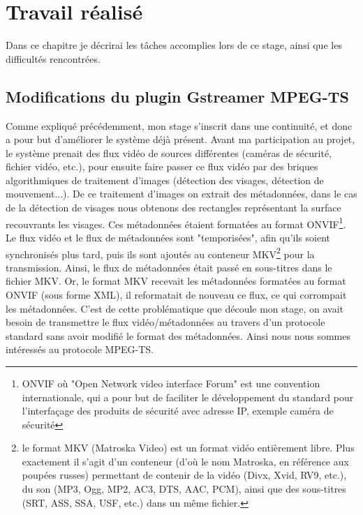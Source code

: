 \chapter{Travail réalisé}
Dans ce chapitre je décrirai les tâches accomplies lors de ce stage, ainsi que les difficultés rencontrées.
\section{Modifications du plugin Gstreamer MPEG-TS}
Comme expliqué précédemment, mon stage s’inscrit dans une continuité, et donc a pour but d'améliorer le système déjà présent. Avant ma participation au projet, le système prenait des flux vidéo de sources différentes (caméras de sécurité, fichier vidéo, etc.), pour ensuite faire passer ce flux vidéo par des briques algorithmiques de traitement d'images (détection des visages, détection de mouvement...). De ce traitement d'images on extrait des métadonnées, dans le cas de la détection de visages nous obtenons des rectangles représentant la surface recouvrants les visages. Ces métadonnées étaient formatées au format ONVIF\footnote{ONVIF où "Open Network video interface Forum" est une convention internationale, qui a pour but de faciliter le développement du standard pour l'interfaçage des produits de sécurité avec adresse IP, exemple caméra de sécurité}. Le flux vidéo et le flux de métadonnées sont "temporisées", afin qu'ils soient synchronisés plus tard, puis ils sont ajoutés au conteneur MKV\footnote{le format MKV (Matroska Video) est un format vidéo entièrement libre. Plus exactement il s'agit d'un conteneur (d'où le nom Matroska, en référence aux poupées russes) permettant de contenir de la vidéo (Divx, Xvid, RV9, etc.), du son (MP3, Ogg, MP2, AC3, DTS, AAC, PCM), ainsi que des sous-titres (SRT, ASS, SSA, USF, etc.) dans un même fichier.} pour la transmission. Ainsi, le flux de métadonnées était passé en sous-titres dans le fichier MKV. Or, le format MKV recevait les métadonnées formatées au format ONVIF (sous forme XML), il reformatait de nouveau ce flux, ce qui corrompait les métadonnées. C'est de cette problématique que découle mon stage, on avait besoin de transmettre le flux vidéo/métadonnées au travers d'un protocole standard sans avoir modifié le format des métadonnées. Ainsi nous nous sommes intéressés au protocole MPEG-TS.


